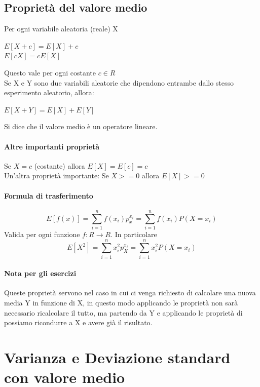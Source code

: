 \documentclass[12pt, a4paper, openany]{book}
\begin{document}
\subsection{Proprietà del valore medio}
Per ogni variabile aleatoria (reale) X
\begin{center}
    $E[X + c] = E[X] + c$
    \\$E[cX] = c E[X]$
\end{center}
Questo vale per ogni costante $c \in R$
\\ Se X e Y sono due variabili aleatorie che dipendono entrambe dallo
stesso esperimento aleatorio, allora:
\begin{center}
    $E[X+Y] = E[X] + E[Y]$
\end{center}
Si dice che il valore medio è un operatore lineare.
\paragraph{Altre importanti proprietà} Se $X = c$ (costante) allora
$E[X] = E[c] = c$
\\ Un'altra proprietà importante: Se $X >= 0$ allora $E[X] >= 0$
\paragraph{Formula di trasferimento} 

\begin{equation}
    E[f(x)] = \sum_{i = 1}^{n} f(x_i)p_x^{x_i}
= \sum_{i = 1}^{n}f(x_i)P(X = x_i)
\end{equation}
Valida per ogni funzione $f:R \to R$. In particolare
\begin{equation}
    E[X^2] = \sum_{i = 1}^{n} x_i^2 p_X^{x_i} = \sum_{i = 1}^{n} x_i^2P(X=x_i)
\end{equation}

\paragraph*{Nota per gli esercizi} Queste proprietà servono nel caso in cui ci venga
richiesto di calcolare una nuova media Y in funzione di X, in questo modo applicando
le proprietà non sarà necessario ricalcolare il tutto, ma partendo da Y e applicando
le proprietà di possiamo ricondurre a X e avere già il risultato.

\section{Varianza e Deviazione standard con valore medio}
\end{document}
